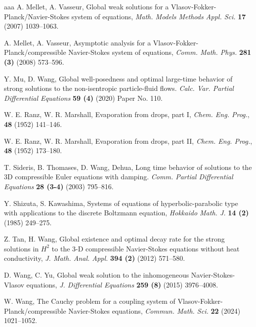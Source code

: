 \documentclass[reqno,11pt]{amsart}
\theoremstyle{plain}
\numberwithin{equation}{section}
\begin{document}
\begin{thebibliography}{aaa}
 A. Mellet, A. Vasseur,
Global weak solutions for a Vlasov-Fokker-Planck/Navier-Stokes system of equations,
{\it Math. Models Methods Appl. Sci.}   {\bf 17} (2007) 1039--1063.

 A. Mellet, A. Vasseur, 
Asymptotic analysis for a Vlasov-Fokker-Planck/compressible Navier-Stokes system of equations,
{\it Comm. Math. Phys.}   {\bf 281 (3)} (2008) 573--596.

  Y. Mu, D. Wang, 
Global well-posedness and optimal large-time behavior of strong solutions to 
the non-isentropic particle-fluid flows. {\it  Calc. Var. Partial Differential Equations}  
{\bf 59  (4)} (2020)   Paper No. 110.





 W. E. Ranz, W. R. Marshall, Evaporation from drops,
 part I, {\it Chem. Eng. Prog.}, {\bf 48} (1952) 141--146.

 W. E. Ranz, W. R. Marshall, Evaporation from drops,
 part II, {\it Chem. Eng. Prog.}, {\bf 48}
(1952) 173--180.

 T. Sideris, B. Thomases, D.  Wang, Dehua,
Long time behavior of solutions to the 3D compressible Euler equations with damping.  
{\it Comm. Partial Differential Equations} \textbf{28 (3-4)} (2003)   795--816. 

 Y. Shizuta, S. Kawashima, 
Systems of equations of hyperbolic-parabolic type with applications to the discrete Boltzmann equation,
{\it Hokkaido Math. J.} {\bf 14 (2)} (1985) 249--275.

    
 Z. Tan,  H. Wang,  
Global existence and optimal decay rate for the strong solutions in 
$H^2$ to the 3-D compressible Navier-Stokes equations without heat conductivity,
{\it J. Math. Anal. Appl.} {\bf 394 (2)} (2012)  571--580.

 

D. Wang, C. Yu, Global weak solution to the inhomogeneous Navier-Stokes-Vlasov equations,
{\it J. Differential Equations} \textbf{259 (8)} (2015) 3976--4008. 


 W. Wang, 
The Cauchy problem for a coupling system of Vlasov-Fokker-Planck/compressible Navier-Stokes equations,
{\it Commun. Math. Sci.}   {\bf 22} (2024) 1021--1052.


\end{thebibliography}
\end{document}

